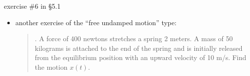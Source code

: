 \documentclass[urlcolor=blue,dvipsnames]{beamer}
\begin{document}
\begin{frame}{exercise \#6 in \S5.1}

\begin{itemize}
\item another exercise of the ``free undamped motion'' type:

\begin{quotation}
. A force of 400 newtons stretches a spring 2 meters.  A mass of 50 kilograms is attached to the end of the spring and is initially released from the equilibrium position with an upward velocity of 10 m/s.  Find the motion $x(t)$.
\end{quotation}
\end{itemize}

\vspace{40mm}
\end{frame}
\end{document}
